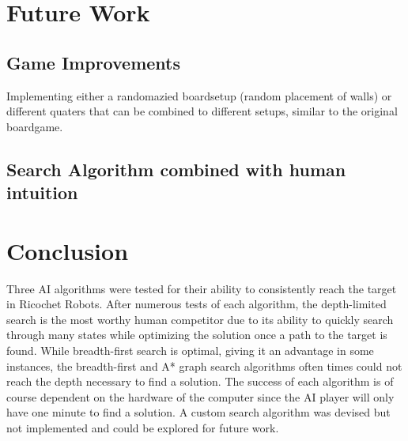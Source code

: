 \documentclass[a4paper,10pt]{article}
\begin{document}
\section{Future Work}
\subsection{Game Improvements}
Implementing either a randomazied boardsetup (random placement of walls) or different quaters that can be combined to different setups, similar to the original boardgame.
\subsection{Search Algorithm combined with human intuition}



\section{Conclusion}
Three AI algorithms were tested for their ability to consistently reach the target in Ricochet Robots. After numerous tests of each algorithm, the depth-limited search is
the most worthy human competitor due to its ability to quickly search through many states while optimizing the solution once a path to the target is found. While breadth-first
search is optimal, giving it an advantage in some instances, the breadth-first and A* graph search algorithms often times could not reach the depth necessary to find a solution.
The success of each algorithm is of course dependent on the hardware of the computer since the AI player will only have one minute to find a solution. A custom search
algorithm was devised but not implemented and could be explored for future work.
\end{document}
